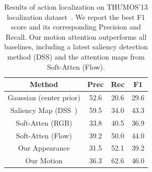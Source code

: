 \documentclass[10pt,twocolumn,letterpaper]{article}
\begin{document}
\begin{table}
\centering
\footnotesize
\begin{tabular}{c|ccc}
Method                                  & Prec        & Rec   & F1    \\ \hline 
Gaussian (center prior)                 & 52.6        & 20.6     & 29.6  \\ 
Saliency Map (DSS~\cite{hou2017deeply}) & 59.5        & 34.0     & 43.3  \\ 
Soft-Atten (RGB)                        & 33.8        & 40.5     & 36.9  \\ 
Soft-Atten (Flow)                       & 39.2        & 50.0     & 44.0  \\ 
Our Appearance                          & 31.5        & 52.1     & 39.2  \\ 
Our Motion                              & 36.3        & 62.6     & 46.0  \\ 
\end{tabular}
\vspace{0.1em}
\caption{Results of action localization on THUMOS'13 localization dataset~\cite{idrees2017thumos}. We report the best F1 score and its corresponding Precision and Recall. Our motion attention outperforms all baselines, including a latest saliency detection method (DSS) and the attention maps from Soft-Atten (Flow).\vspace{-1em}}
\label{table:Localization}
\end{table}
\end{document}
